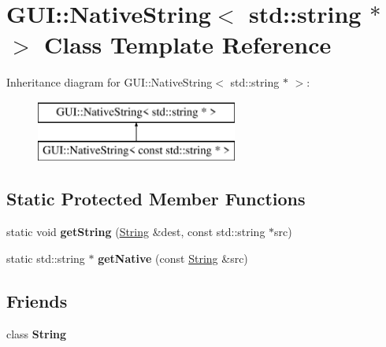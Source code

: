 \hypertarget{classGUI_1_1NativeString_3_01std_1_1string_01_5_01_4}{\section{G\-U\-I\-:\-:Native\-String$<$ std\-:\-:string $\ast$ $>$ Class Template Reference}
\label{classGUI_1_1NativeString_3_01std_1_1string_01_5_01_4}
}
Inheritance diagram for G\-U\-I\-:\-:Native\-String$<$ std\-:\-:string $\ast$ $>$\-:\begin{figure}[H]
\begin{center}
\leavevmode
\includegraphics[height=2.000000cm]{classGUI_1_1NativeString_3_01std_1_1string_01_5_01_4}
\end{center}
\end{figure}
\subsection*{Static Protected Member Functions}
\begin{DoxyCompactItemize}
\item 
\hypertarget{classGUI_1_1NativeString_3_01std_1_1string_01_5_01_4_a25bbea9b2cb5cea20dc06ae85e4c13ab}{static void {\bfseries get\-String} (\hyperlink{classGUI_1_1String}{String} \&dest, const std\-::string $\ast$src)}\label{classGUI_1_1NativeString_3_01std_1_1string_01_5_01_4_a25bbea9b2cb5cea20dc06ae85e4c13ab}

\item 
\hypertarget{classGUI_1_1NativeString_3_01std_1_1string_01_5_01_4_a085456220b679ab06e02ac69625f3b79}{static std\-::string $\ast$ {\bfseries get\-Native} (const \hyperlink{classGUI_1_1String}{String} \&src)}\label{classGUI_1_1NativeString_3_01std_1_1string_01_5_01_4_a085456220b679ab06e02ac69625f3b79}

\end{DoxyCompactItemize}
\subsection*{Friends}
\begin{DoxyCompactItemize}
\item 
\hypertarget{classGUI_1_1NativeString_3_01std_1_1string_01_5_01_4_a7fb804f7dc96dd9f705c84095f37f1ca}{class {\bfseries String}}\label{classGUI_1_1NativeString_3_01std_1_1string_01_5_01_4_a7fb804f7dc96dd9f705c84095f37f1ca}

\end{DoxyCompactItemize}


